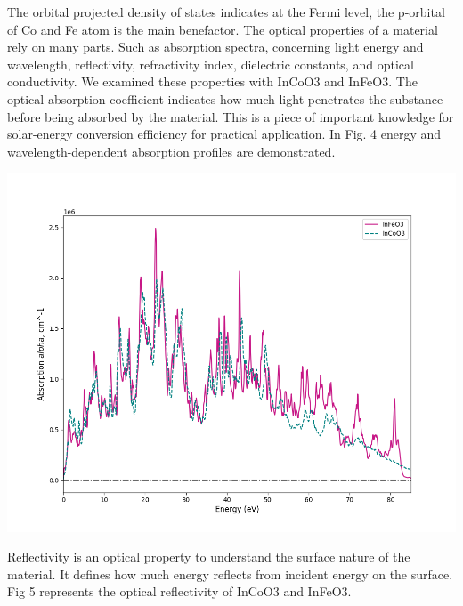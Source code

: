 \documentclass[12pt, letterpaper]{article}
\newcommand*{\1}{\hspace{1pt}}
\begin{document}
    The orbital projected density of states indicates at the Fermi level, the p-orbital of Co and Fe atom is the main benefactor. The optical properties of a 
    material rely on many parts. Such as absorption spectra, concerning light energy and wavelength, reflectivity, refractivity index, dielectric constants, and 
    optical conductivity. We examined these properties with InCoO3 and InFeO3.  The optical absorption coefficient indicates how much light penetrates the substance 
    before being absorbed by the material. This is a piece of important knowledge for solar-energy conversion efficiency for practical application. In Fig. 4 energy 
    and wavelength-dependent absorption profiles are demonstrated.
    
    \begin{adjustbox}{center,caption={Absorption Of InCoO3 and InFeO3},label={somelabel},nofloat=figure,vspace=\bigskipamount,}
        \includegraphics[width=\textwidth]{Absorptioneng}
    \end{adjustbox}
    
    Reflectivity is an optical property to understand the surface nature of the material. It defines 
    how much energy reflects from incident energy on the surface. Fig 5 represents the optical reflectivity of InCoO3 and InFeO3. 
    
\end{document}
